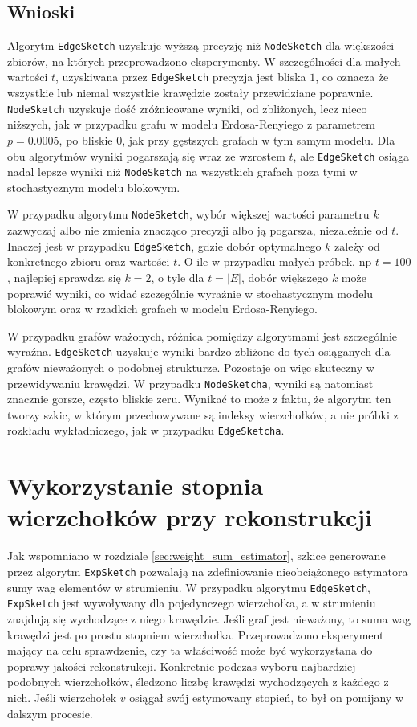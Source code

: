    \subsection{Wnioski}
    Algorytm \texttt{EdgeSketch} uzyskuje wyższą precyzję niż \texttt{NodeSketch} dla większości zbiorów, na których przeprowadzono eksperymenty. W szczególności dla małych wartości $t$, uzyskiwana przez \texttt{EdgeSketch} precyzja jest bliska $1$, co oznacza że wszystkie lub niemal wszystkie krawędzie zostały przewidziane poprawnie. \texttt{NodeSketch} uzyskuje dość zróżnicowane wyniki, od zbliżonych, lecz nieco niższych, jak w przypadku grafu w modelu Erdosa-Renyiego z parametrem $p = 0.0005$, po bliskie $0$, jak przy gęstszych grafach w tym samym modelu. Dla obu algorytmów wyniki pogarszają się wraz ze wzrostem $t$, ale \texttt{EdgeSketch} osiąga nadal lepsze wyniki niż \texttt{NodeSketch} na wszystkich grafach poza tymi w stochastycznym modelu blokowym. 
    
    W przypadku algorytmu \texttt{NodeSketch}, wybór większej wartości parametru $k$ zazwyczaj albo nie zmienia znacząco precyzji albo ją pogarsza, niezależnie od $t$. Inaczej jest w przypadku \texttt{EdgeSketch}, gdzie dobór optymalnego $k$ zależy od konkretnego zbioru oraz wartości $t$. O ile w przypadku małych próbek, np $t = 100$, najlepiej sprawdza się $k = 2$, o tyle dla $t = |E|$, dobór większego $k$ może poprawić wyniki, co widać szczególnie wyraźnie w stochastycznym modelu blokowym oraz w rzadkich grafach w modelu Erdosa-Renyiego. 

    W przypadku grafów ważonych, różnica pomiędzy algorytmami jest szczególnie wyraźna. \texttt{EdgeSketch} uzyskuje wyniki bardzo zbliżone do tych osiąganych dla grafów nieważonych o podobnej strukturze. Pozostaje on więc skuteczny w przewidywaniu krawędzi. W przypadku \texttt{NodeSketcha}, wyniki są natomiast znacznie gorsze, często bliskie zeru. Wynikać to może z faktu, że algorytm ten tworzy szkic, w którym przechowywane są indeksy wierzchołków, a nie próbki z rozkładu wykładniczego, jak w przypadku \texttt{EdgeSketcha}.

\section{Wykorzystanie stopnia wierzchołków przy rekonstrukcji}
    Jak wspomniano w rozdziale \ref{sec:weight_sum_estimator}, szkice generowane przez algorytm \texttt{ExpSketch} pozwalają na zdefiniowanie nieobciążonego estymatora sumy wag elementów w strumieniu. W przypadku algorytmu \texttt{EdgeSketch}, \texttt{ExpSketch} jest wywoływany dla pojedynczego wierzchołka, a w strumieniu znajdują się wychodzące z niego krawędzie. Jeśli graf jest nieważony, to suma wag krawędzi jest po prostu stopniem wierzchołka. 
    Przeprowadzono eksperyment mający na celu sprawdzenie, czy ta właściwość może być wykorzystana do poprawy jakości rekonstrukcji. Konkretnie podczas wyboru najbardziej podobnych wierzchołków, śledzono liczbę krawędzi wychodzących z każdego z nich. Jeśli wierzchołek $v$ osiągał swój estymowany stopień, to był on pomijany w dalszym procesie.  
    
